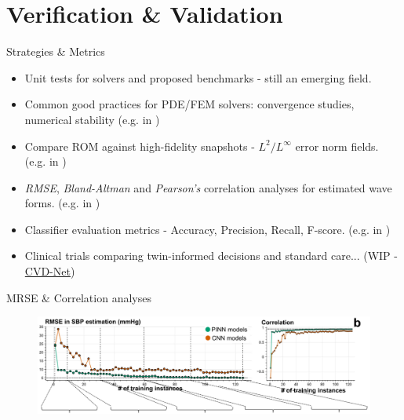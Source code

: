 \documentclass{beamer}
\begin{document}
\section{Verification \& Validation}
\begin{frame}{Strategies \& Metrics}

    \begin{itemize}
        \item Unit tests for solvers and proposed benchmarks - still an emerging field. \textcite{Reidmen2025}
        \item Common good practices for PDE/FEM solvers: convergence studies, numerical stability (e.g. in \textcite{gerach2021electro})
        \item Compare ROM against high-fidelity snapshots - $L^2/L^\infty$ error norm fields. (e.g. in \textcite{Fresca2021})
        \item \textit{RMSE}, \textit{Bland-Altman} and \textit{Pearson’s} correlation analyses for estimated wave forms. (e.g. in \textcite{jafari2022})
        \item Classifier evaluation metrics - Accuracy, Precision, Recall, F-score. (e.g. in \textcite{burak2023})
        \item Clinical trials comparing twin-informed decisions and standard care... (WIP - \href{https://www.imperial.ac.uk/news/253154/digital-twin-heart-modelling-project-will/?utm_source}{CVD-Net})
    \end{itemize}
\end{frame}

\begin{frame}{MRSE \& Correlation analyses}
  
  \begin{figure}
      \centering
      \includegraphics[width=1\linewidth]{images/MRSE.png}
      \caption{\textcite{jafari2022}}
  \end{figure}

\end{frame}
\end{document}
